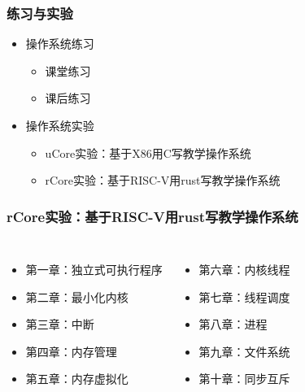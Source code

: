 \documentclass[UTF8]{ctexbeamer}
\begin{document}
    \begin{frame}
        \frametitle{练习与实验}
        \begin{itemize}
            \item 操作系统练习
        \begin{itemize}
    \begin{itemize}
		\item 课堂练习
		\item 课后练习
    \end{itemize}
        \end{itemize}

            \item 操作系统实验
    \begin{itemize}
		\item uCore实验：基于X86用C写教学操作系统
		\item rCore实验：基于RISC-V用rust写教学操作系统
    \end{itemize}
        \end{itemize}
\end{frame}

\begin{frame}
\frametitle{rCore实验：基于RISC-V用rust写教学操作系统}
\begin{columns}
\begin{itemize}
		\item 第一章：独立式可执行程序
		\item 第二章：最小化内核
		\item 第三章：中断
		\item 第四章：内存管理
		\item 第五章：内存虚拟化
\end{itemize}
 
    \begin{itemize}
		\item 第六章：内核线程
		\item 第七章：线程调度
		\item 第八章：进程
		\item 第九章：文件系统
		\item 第十章：同步互斥
    \end{itemize}
\end{columns}
\end{frame}
\end{document}
